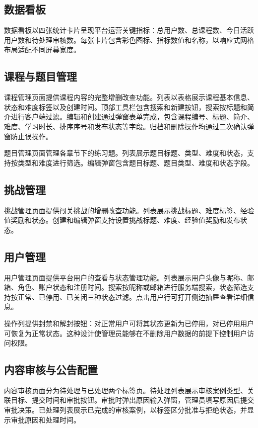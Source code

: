 \subsection{数据看板}

数据看板以四张统计卡片呈现平台运营关键指标：总用户数、总课程数、今日活跃用户数和待处理审核数。每张卡片包含彩色图标、指标数值和名称，以响应式网格布局适配不同屏幕宽度。

\subsection{课程与题目管理}

课程管理页面提供课程内容的完整增删改查功能。列表以表格展示课程基本信息、状态和难度标签以及创建时间。顶部工具栏包含搜索和新建按钮，搜索按标题和简介进行客户端过滤。编辑和创建通过弹窗表单完成，包含课程编号、标题、简介、难度、学习时长、排序序号和发布状态等字段。归档和删除操作均通过二次确认弹窗防止误操作。

题目管理页面管理各章节下的练习题。列表展示题目标题、类型、难度和状态，支持按类型和难度进行筛选。编辑弹窗包含题目标题、题目类型、难度和状态字段。

\subsection{挑战管理}

挑战管理页面提供闯关挑战的增删改查功能。列表展示挑战标题、难度标签、经验值奖励和状态。创建和编辑弹窗支持设置挑战标题、难度、经验值奖励和发布状态。

\subsection{用户管理}

用户管理页面提供平台用户的查看与状态管理功能。列表展示用户头像与昵称、邮箱、角色、账户状态和注册时间。搜索按昵称或邮箱进行服务端搜索，状态筛选支持按正常、已停用、已关闭三种状态过滤。点击用户行可打开侧边抽屉查看详细信息。

操作列提供封禁和解封按钮：对正常用户可将其状态更新为已停用，对已停用用户可恢复为正常状态。这种设计使管理员能够在不删除用户数据的前提下控制用户访问权限。

\subsection{内容审核与公告配置}

内容审核页面分为待处理与已处理两个标签页。待处理列表展示审核案例类型、关联目标、提交时间和审批按钮。审批时弹出原因输入弹窗，管理员填写原因后提交审批决策。已处理列表展示已完成的审核案例，以标签区分批准与拒绝状态，并显示审批原因和处理时间。

